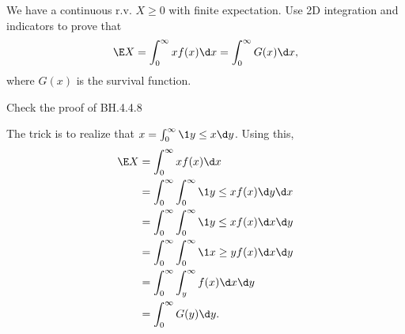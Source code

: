\begin{exercise}
We have a continuous r.v. $X\geq 0$ with finite expectation. Use 2D integration and indicators to prove that
\begin{align}
\E X = \int_{0}^{\infty} x f(x) \d x = \int_{0}^{\infty} G(x) \d x,
\end{align}
where $G(x)$ is the survival function.
\begin{hint}
  Check the proof of BH.4.4.8
\end{hint}
\begin{solution}
The trick is to realize that $x = \int_0^{\infty} \1{y\leq x} \d y$. Using this,
\begin{align}
\E X
&= \int_{0}^{\infty} x f(x) \d x \\
&= \int_{0}^{\infty} \int_{0}^{\infty} \1{y \leq x} f(x) \d y \d x \\
&= \int_{0}^{\infty} \int_{0}^{\infty} \1{y \leq x} f(x) \d x \d y \\
&= \int_{0}^{\infty} \int_{0}^{\infty} \1{x \geq y} f(x) \d x \d y \\
&= \int_{0}^{\infty} \int_{y}^{\infty} f(x) \d x \d y \\
&= \int_{0}^{\infty} G(y) \d y.
\end{align}
\end{solution}
\end{exercise}


